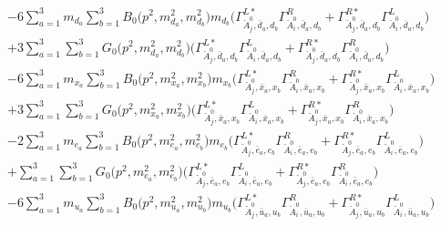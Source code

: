 \begin{itemize}
\begin{align}
 &-6 \sum_{a=1}^{3}m_{d_{{a}}} \sum_{b=1}^{3}{B_0\Big(p^{2},m^2_{d_{{a}}},m^2_{d_{{b}}}\Big)} m_{d_{{b}}} \Big({\Gamma^{L*}_{\check{A}^0_{{j}},\bar{d}_{{a}},d_{{b}}}} {\Gamma^R_{\check{A}^0_{{i}},\bar{d}_{{a}},d_{{b}}}}  + {\Gamma^{R*}_{\check{A}^0_{{j}},\bar{d}_{{a}},d_{{b}}}} {\Gamma^L_{\check{A}^0_{{i}},\bar{d}_{{a}},d_{{b}}}} \Big)  \nonumber \\ 
 &+3 \sum_{a=1}^{3}\sum_{b=1}^{3}{G_0\Big(p^{2},m^2_{d_{{a}}},m^2_{d_{{b}}}\Big)} \Big({\Gamma^{L*}_{\check{A}^0_{{j}},\bar{d}_{{a}},d_{{b}}}} {\Gamma^L_{\check{A}^0_{{i}},\bar{d}_{{a}},d_{{b}}}}  + {\Gamma^{R*}_{\check{A}^0_{{j}},\bar{d}_{{a}},d_{{b}}}} {\Gamma^R_{\check{A}^0_{{i}},\bar{d}_{{a}},d_{{b}}}} \Big) \nonumber \\ 
 &-6 \sum_{a=1}^{3}m_{x_{{a}}} \sum_{b=1}^{3}{B_0\Big(p^{2},m^2_{x_{{a}}},m^2_{x_{{b}}}\Big)} m_{x_{{b}}} \Big({\Gamma^{L*}_{\check{A}^0_{{j}},\bar{x}_{{a}},x_{{b}}}} {\Gamma^R_{\check{A}^0_{{i}},\bar{x}_{{a}},x_{{b}}}}  + {\Gamma^{R*}_{\check{A}^0_{{j}},\bar{x}_{{a}},x_{{b}}}} {\Gamma^L_{\check{A}^0_{{i}},\bar{x}_{{a}},x_{{b}}}} \Big)  \nonumber \\ 
 &+3 \sum_{a=1}^{3}\sum_{b=1}^{3}{G_0\Big(p^{2},m^2_{x_{{a}}},m^2_{x_{{b}}}\Big)} \Big({\Gamma^{L*}_{\check{A}^0_{{j}},\bar{x}_{{a}},x_{{b}}}} {\Gamma^L_{\check{A}^0_{{i}},\bar{x}_{{a}},x_{{b}}}}  + {\Gamma^{R*}_{\check{A}^0_{{j}},\bar{x}_{{a}},x_{{b}}}} {\Gamma^R_{\check{A}^0_{{i}},\bar{x}_{{a}},x_{{b}}}} \Big) \nonumber \\ 
 &-2 \sum_{a=1}^{3}m_{e_{{a}}} \sum_{b=1}^{3}{B_0\Big(p^{2},m^2_{e_{{a}}},m^2_{e_{{b}}}\Big)} m_{e_{{b}}} \Big({\Gamma^{L*}_{\check{A}^0_{{j}},\bar{e}_{{a}},e_{{b}}}} {\Gamma^R_{\check{A}^0_{{i}},\bar{e}_{{a}},e_{{b}}}}  + {\Gamma^{R*}_{\check{A}^0_{{j}},\bar{e}_{{a}},e_{{b}}}} {\Gamma^L_{\check{A}^0_{{i}},\bar{e}_{{a}},e_{{b}}}} \Big)  \nonumber \\ 
 &+\sum_{a=1}^{3}\sum_{b=1}^{3}{G_0\Big(p^{2},m^2_{e_{{a}}},m^2_{e_{{b}}}\Big)} \Big({\Gamma^{L*}_{\check{A}^0_{{j}},\bar{e}_{{a}},e_{{b}}}} {\Gamma^L_{\check{A}^0_{{i}},\bar{e}_{{a}},e_{{b}}}}  + {\Gamma^{R*}_{\check{A}^0_{{j}},\bar{e}_{{a}},e_{{b}}}} {\Gamma^R_{\check{A}^0_{{i}},\bar{e}_{{a}},e_{{b}}}} \Big)\nonumber \\ 
 &-6 \sum_{a=1}^{3}m_{u_{{a}}} \sum_{b=1}^{3}{B_0\Big(p^{2},m^2_{u_{{a}}},m^2_{u_{{b}}}\Big)} m_{u_{{b}}} \Big({\Gamma^{L*}_{\check{A}^0_{{j}},\bar{u}_{{a}},u_{{b}}}} {\Gamma^R_{\check{A}^0_{{i}},\bar{u}_{{a}},u_{{b}}}}  + {\Gamma^{R*}_{\check{A}^0_{{j}},\bar{u}_{{a}},u_{{b}}}} {\Gamma^L_{\check{A}^0_{{i}},\bar{u}_{{a}},u_{{b}}}} \Big)  \nonumber \\ 

\end{align}
\end{itemize}
